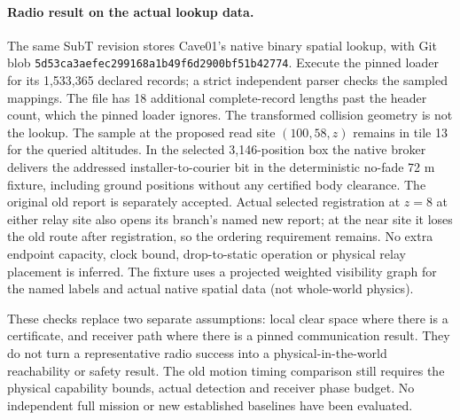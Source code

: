 \documentclass{article}
\begin{document}
\paragraph{Radio result on the actual lookup data.}
The same SubT revision stores Cave01's native binary spatial
lookup, with Git blob \texttt{5d53ca3aefec299168a1b49f6d2900bf51b42774}.
Execute the pinned loader for its 1,533,365 declared records;
a strict independent parser checks the sampled mappings.
The file has 18 additional complete-record lengths past
the header count, which the pinned loader ignores. The
transformed collision geometry is not the lookup.
The sample at the proposed read site \((100,58,z)\) remains
in tile 13 for the queried altitudes. In the selected
3,146-position box the native broker delivers the addressed
installer-to-courier bit in the deterministic no-fade 72 m
fixture, including ground positions without any certified body
clearance. The original old report is separately accepted.
Actual selected registration at \(z=8\) at either relay site
also opens its branch's named new report; at the near site it
loses the old route after registration, so the ordering
requirement remains. No extra endpoint capacity, clock bound,
drop-to-static operation or physical relay placement is inferred.
The fixture uses a projected weighted visibility graph for the
named labels and actual native spatial data (not whole-world physics).

These checks replace two separate assumptions: local clear
space where there is a certificate, and receiver path where
there is a pinned communication result. They do not turn a
representative radio success into a physical-in-the-world reachability
or safety result. The old motion timing comparison still requires
the physical capability bounds, actual detection and receiver
phase budget. No independent full mission or new established
baselines have been evaluated.
\end{document}
